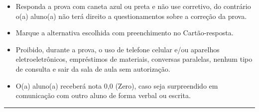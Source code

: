 \documentclass[a4paper,12pt]{article}
\begin{document}
\noindent
\begin{minipage}{\textwidth}
\scriptsize
\begin{itemize}[itemsep=0pt, topsep=0pt, parsep=0pt]
    \item Responda a prova com caneta azul ou preta e não use corretivo, do contrário o(a) aluno(a) não terá direito a questionamentos sobre a correção da prova.
    \item Marque a alternativa escolhida com preenchimento no Cartão-resposta.
    \item Proibido, durante a prova, o uso de telefone celular e/ou aparelhos eletroeletrônicos, empréstimos de materiais, conversas paralelas, nenhum tipo de consulta e sair da sala de aula sem autorização.
    \item O(a) aluno(a) receberá nota 0,0 (Zero), caso seja surpreendido em comunicação com outro aluno de forma verbal ou escrita.
\end{itemize}
\end{minipage}

\vspace{0.5cm}
\noindent\rule{\textwidth}{1pt}

\end{document}
